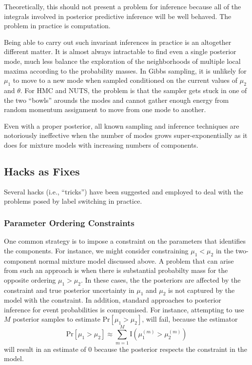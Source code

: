 Theoretically, this should not present a problem for inference because
all of the integrals involved in posterior predictive inference will
be well behaved. The problem in practice is computation. 

Being able to carry out such invariant inferences in practice is an
altogether different matter.  It is almost always intractable to find
even a single posterior mode, much less balance the exploration of the
neighborhoods of multiple local maxima according to the probability
masses. In Gibbs sampling, it is unlikely for $\mu_1$
to move to a new mode when sampled conditioned on the current values
of $\mu_2$ and $\theta$. For HMC and NUTS, the problem is that the
sampler gets stuck in one of the two ``bowls'' arounds the modes and
cannot gather enough energy from random momentum assignment to move
from one mode to another.

Even with a proper posterior, all known sampling and inference
techniques are notoriously ineffective when the number of modes grows
super-exponentially as it does for mixture models with increasing
numbers of components.

\subsection{Hacks as Fixes}

Several hacks (i.e., ``tricks'') have been suggested and employed to
deal with the problems posed by label switching in practice.

\subsubsection{Parameter Ordering Constraints}

One common strategy is to impose a constraint on the parameters that
identifies the components.  For instance, we might consider
constraining $\mu_1 < \mu_2$ in the two-component normal mixture model
discussed above.  A problem that can arise from such an approach is
when there is substantial probabilty mass for the opposite ordering
$\mu_1 > \mu_2$.  In these cases, the the posteriors are affected by
the constraint and true posterior uncertainty in $\mu_1$ and $\mu_2$
is not captured by the model with the constraint.  In addition,
standard approaches to posterior inference for event probabilities is
compromised.  For instance, attempting to use $M$ posterior samples to
estimate $\mbox{Pr}[\mu_1 > \mu_2]$, will fail, because the estimator
\[
\mbox{Pr}[\mu_1 > \mu_2] 
\approx 
\sum_{m=1}^M \mbox{I}(\mu_1^{(m)} > \mu_2^{(m)})
\]
will result in an estimate of 0 because the posterior respects the
constraint in the model.  

